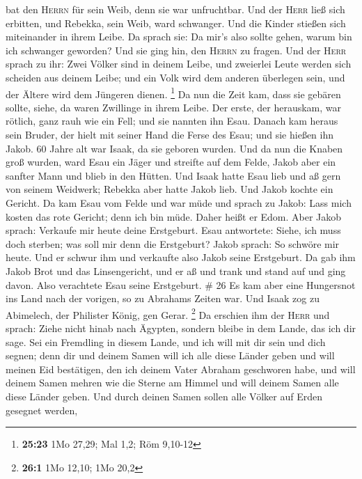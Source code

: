 bat den \textsc{Herrn} für sein Weib, denn sie war unfruchtbar. Und der
\textsc{Herr} ließ sich erbitten, und Rebekka, sein Weib, ward
schwanger.  Und die Kinder stießen sich miteinander in
ihrem Leibe. Da sprach sie: Da mir's also sollte gehen, warum bin ich
schwanger geworden? Und sie ging hin, den \textsc{Herrn} zu fragen.
 Und der \textsc{Herr} sprach zu ihr: Zwei Völker sind in
deinem Leibe, und zweierlei Leute werden sich scheiden aus deinem Leibe;
und ein Volk wird dem anderen überlegen sein, und der Ältere wird dem
Jüngeren dienen. \footnote{\textbf{25:23} 1Mo 27,29; Mal 1,2; Röm
  9,10-12}  Da nun die Zeit kam, dass sie gebären sollte,
siehe, da waren Zwillinge in ihrem Leibe.  Der erste, der
herauskam, war rötlich, ganz rauh wie ein Fell; und sie nannten ihn
Esau.  Danach kam heraus sein Bruder, der hielt mit
seiner Hand die Ferse des Esau; und sie hießen ihn Jakob. 60 Jahre alt
war Isaak, da sie geboren wurden.  Und da nun die Knaben
groß wurden, ward Esau ein Jäger und streifte auf dem Felde, Jakob aber
ein sanfter Mann und blieb in den Hütten.  Und Isaak
hatte Esau lieb und aß gern von seinem Weidwerk; Rebekka aber hatte
Jakob lieb.  Und Jakob kochte ein Gericht. Da kam Esau
vom Felde und war müde  und sprach zu Jakob: Lass mich
kosten das rote Gericht; denn ich bin müde. Daher heißt er Edom.
 Aber Jakob sprach: Verkaufe mir heute deine Erstgeburt.
 Esau antwortete: Siehe, ich muss doch sterben; was soll
mir denn die Erstgeburt?  Jakob sprach: So schwöre mir
heute. Und er schwur ihm und verkaufte also Jakob seine Erstgeburt.
 Da gab ihm Jakob Brot und das Linsengericht, und er aß
und trank und stand auf und ging davon. Also verachtete Esau seine
Erstgeburt. \# 26  Es kam aber eine Hungersnot ins Land
nach der vorigen, so zu Abrahams Zeiten war. Und Isaak zog zu Abimelech,
der Philister König, gen Gerar. \footnote{\textbf{26:1} 1Mo 12,10; 1Mo
  20,2}  Da erschien ihm der \textsc{Herr} und sprach:
Ziehe nicht hinab nach Ägypten, sondern bleibe in dem Lande, das ich dir
sage.  Sei ein Fremdling in diesem Lande, und ich will mit
dir sein und dich segnen; denn dir und deinem Samen will ich alle diese
Länder geben und will meinen Eid bestätigen, den ich deinem Vater
Abraham geschworen habe,  und will deinem Samen mehren wie
die Sterne am Himmel und will deinem Samen alle diese Länder geben. Und
durch deinen Samen sollen alle Völker auf Erden gesegnet werden,
